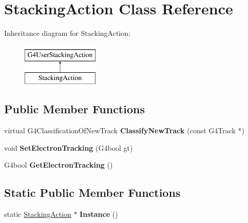 \hypertarget{class_stacking_action}{}\section{Stacking\+Action Class Reference}
\label{class_stacking_action}
Inheritance diagram for Stacking\+Action\+:\begin{figure}[H]
\begin{center}
\leavevmode
\includegraphics[height=2.000000cm]{class_stacking_action}
\end{center}
\end{figure}
\subsection*{Public Member Functions}
\begin{DoxyCompactItemize}
\item 
\hypertarget{class_stacking_action_af4780653d9e224f8d75d60e47005ea9b}{}\label{class_stacking_action_af4780653d9e224f8d75d60e47005ea9b} 
virtual G4\+Classification\+Of\+New\+Track {\bfseries Classify\+New\+Track} (const G4\+Track $\ast$)
\item 
\hypertarget{class_stacking_action_a2ac15000ac08f0f58278316e0225476b}{}\label{class_stacking_action_a2ac15000ac08f0f58278316e0225476b} 
void {\bfseries Set\+Electron\+Tracking} (G4bool gt)
\item 
\hypertarget{class_stacking_action_a5151519faf863ff7f6be8c3cf09ef412}{}\label{class_stacking_action_a5151519faf863ff7f6be8c3cf09ef412} 
G4bool {\bfseries Get\+Electron\+Tracking} ()
\end{DoxyCompactItemize}
\subsection*{Static Public Member Functions}
\begin{DoxyCompactItemize}
\item 
\hypertarget{class_stacking_action_a79aa8eb0da18014a9c1a982f3b4adf65}{}\label{class_stacking_action_a79aa8eb0da18014a9c1a982f3b4adf65} 
static \hyperlink{class_stacking_action}{Stacking\+Action} $\ast$ {\bfseries Instance} ()
\end{DoxyCompactItemize}

